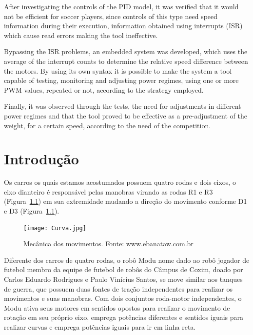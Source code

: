 \documentclass[a4paper,12pt,portuguese]{ufms-cpcx}
\begin{document}
After investigating the controls of the PID model, it was verified that it would not be efficient for soccer players, since controls of this type need speed information during their execution, information obtained using interrupts (ISR) which cause read errors making the tool ineffective.

Bypassing the ISR problems, an embedded system was developed, which uses the average of the interrupt counts to determine the relative speed difference between the motors. By using its own syntax it is possible to make the system a tool capable of testing, monitoring and adjusting power regimes, using one or more PWM values, repeated or not, according to the strategy employed.

Finally, it was observed through the tests, the need for adjustments in different power regimes and that the tool proved to be effective as a pre-adjustment of the weight, for a certain speed, according to the need of the competition.


\cleardoublepage
{}
\setcounter{page}{1}
\tableofcontents

\cleardoublepage
{}
\listoffigures

\cleardoublepage
{}
\listoftables

\cleardoublepage
{}
\setcounter{page}{1}

\chapter{Introdução}
Os carros os quais estamos acostumados possuem quatro rodas e dois eixos, o eixo dianteiro é responsável pelas manobras virando as rodas R1 e R3 (Figura~\ref{fig:carrocurva}) em sua extremidade mudando a direção do movimento conforme D1 e D3 (Figura~\ref{fig:carrocurva}).
\begin{figure}[H]
	\centering
	\texttt{[image: Curva.jpg]}
	\caption{Mecânica dos movimentos. Fonte: www.ebanataw.com.br}
	\label{fig:carrocurva}
\end{figure}
Diferente dos carros de quatro rodas, o robô Modu nome dado ao robô jogador de futebol membro da equipe de futebol de robôs do Câmpus de Coxim, doado por Carlos Eduardo Rodrigues e Paulo Vinícius Santos, se move similar aos tanques de guerra, que possuem duas fontes de tração independentes para realizar os movimentos e suas manobras.
Com dois conjuntos roda-motor independentes, o Modu ativa seus motores em sentidos opostos para realizar o movimento de rotação em seu próprio eixo, emprega potências diferentes e sentidos iguais para realizar curvas e emprega potências iguais para ir em linha reta. 
\end{document}
